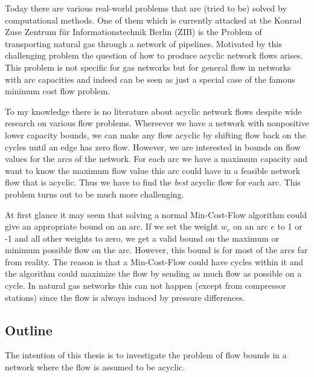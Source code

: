 
Today there are various real-world problems that are (tried to be) solved by computational methods. One of them which 
is currently attacked at the Konrad Zuse Zentrum für Informationstechnik Berlin (ZIB) is the Problem of transporting 
natural gas through a network of pipelines. Motivated by this challenging problem the question of how to produce 
acyclic network flows arises. This problem is not specific for gas networks but for general flow in networks with arc 
capacities and indeed can be seen as just a special case of the famous minimum cost flow problem. 

To my knowledge there is no literature about acyclic network flows despite wide research on various flow problems. 
Whereever we have a network with nonpositive lower capacity bounds, we can make any flow acyclic by shifting flow 
back on the cycles until an edge has zero flow. 
However, we are interested in bounds on flow values for the arcs of the network. For each arc we have a maximum 
capacity and want to know the maximum flow value this arc could have in a feasible network flow that is acyclic. Thus 
we have to find the \textit{best} acyclic flow for each arc. This problem turns out to be much more challenging.


At first glance it may seem that solving a normal Min-Cost-Flow algorithm could give an appropriate bound 
on an arc. If we set the weight $w_e$ on an arc $e$ to 1 or -1 and all other weights to zero, we get 
a valid bound on the maximum or minimum possible flow on the arc. However, this bound is for most of the arcs far from 
reality. The reason is that a Min-Cost-Flow could have cycles within it and the algorithm could maximize the flow by 
sending as much flow as possible on a cycle. In natural gas networks this can not happen (except from compressor 
stations) since the flow is always induced by pressure differences.\\

\subsection{Outline}
The intention of this thesis is to investigate the problem of flow bounds in a network where the flow is assumed to be 
acyclic. 

